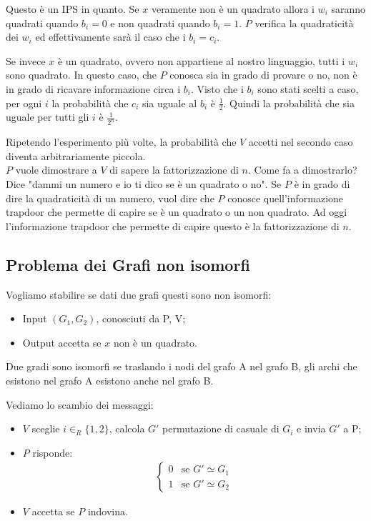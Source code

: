 \noindent Questo è un IPS in quanto. Se $x$ veramente non è un quadrato allora i $w_i$ saranno quadrati quando $b_i = 0$ e non quadrati quando $b_i = 1$. $P$ verifica la quadraticità dei $w_i$ ed effettivamente sarà il caso che i $b_i = c_i$.

Se invece $x$ è un quadrato, ovvero non appartiene al nostro linguaggio, tutti i $w_i$ sono quadrato. In questo caso, che $P$ conosca sia in grado di provare o no, non è in grado di ricavare informazione circa i $b_i$. Visto che i $b_i$ sono stati scelti a caso, per ogni $i$ la probabilità che $c_i$ sia uguale al $b_i$ è $\frac{1}{2}$. Quindi la probabilità che sia uguale per tutti gli $i$ è $\frac{1}{2^n}$.

Ripetendo l'esperimento più volte, la probabilità che $V$ accetti nel secondo caso diventa arbitrariamente piccola. 
\\

\noindent $P$ vuole dimostrare a $V$ di sapere la fattorizzazione di $n$. Come fa a dimostrarlo? Dice "dammi un numero e io ti dico se è un quadrato o no". Se $P$ è in grado di dire la quadraticità di un numero, vuol dire che $P$ conosce quell'informazione trapdoor che permette di capire se è un quadrato o un non quadrato. Ad oggi l'informazione trapdoor che permette di capire questo è la fattorizzazione di $n$.

\subsection{Problema dei Grafi non isomorfi}
Vogliamo stabilire se dati due grafi questi sono non isomorfi:
\begin{itemize}
    \item Input $(G_1, G_2)$, conosciuti da P, V;
    \item Output accetta se $x$ non è un quadrato.
\end{itemize}

\begin{definition}
    Due gradi sono isomorfi se traslando i nodi del grafo A nel grafo B, gli archi che esistono nel grafo A esistono anche nel grafo B.
\end{definition}

\noindent Vediamo lo scambio dei messaggi:
\begin{itemize}
    \item $V$ sceglie $i \in_R \{1, 2\}$, calcola $G'$ permutazione di casuale di $G_i$ e invia $G'$ a P;
    \item $P$ risponde: 
    \begin{align*}
        \begin{cases} 
            0& \mbox{se } G' \simeq G_1 \\ 
            1& \mbox{se } G' \simeq G_2
        \end{cases}
    \end{align*}
    \item $V$ accetta se $P$ indovina.
\end{itemize}

